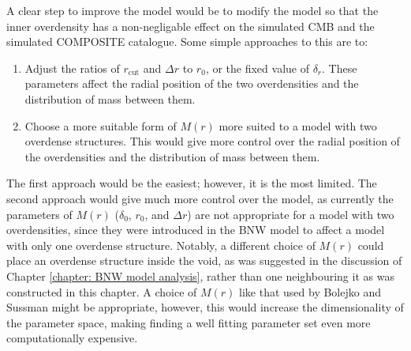 \documentclass[a4paper,12pt]{report}
\begin{document}
A clear step to improve the model would be to modify the model so that the inner overdensity has a non-negligable effect on the simulated CMB and the simulated COMPOSITE catalogue. Some simple approaches to this are to:
\begin{enumerate}
    \item Adjust the ratios of $r_\text{cut}$ and $\Delta r$ to $r_0$, or the fixed value of $\delta_r$.  These parameters affect the radial position of the two overdensities and the distribution of mass between them.
    \item Choose a more suitable form of $M(r)$ more suited to a model with two overdense structures. This would give more control over the radial position of the overdensities and the distribution of mass between them.
\end{enumerate}
The first approach would be the easiest; however, it is the most limited.
The second approach would give much more control over the model, as currently the parameters of $M(r)$ ($\delta_0$, $r_0$, and $\Delta r$) are not appropriate for a model with two overdensities, since they were introduced in the BNW model to affect a model with only one overdense structure. Notably, a different choice of $M(r)$ could place an overdense structure inside the void, as was suggested in the discussion of Chapter \ref{chapter: BNW model analysis}, rather than one neighbouring it as was constructed in this chapter. A choice of $M(r)$ like that used by Bolejko and Sussman \cite{RN39} might be appropriate, however, this would increase the dimensionality of the parameter space, making finding a well fitting parameter set even more computationally expensive.
\end{document}
